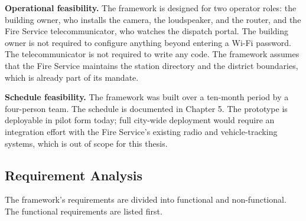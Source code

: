 \textbf{Operational feasibility.} The framework is designed for two operator roles: the building owner, who installs the camera, the loudspeaker, and the router, and the Fire Service telecommunicator, who watches the dispatch portal. The building owner is not required to configure anything beyond entering a Wi-Fi password. The telecommunicator is not required to write any code. The framework assumes that the Fire Service maintains the station directory and the district boundaries, which is already part of its mandate.

\textbf{Schedule feasibility.} The framework was built over a ten-month period by a four-person team. The schedule is documented in Chapter 5. The prototype is deployable in pilot form today; full city-wide deployment would require an integration effort with the Fire Service's existing radio and vehicle-tracking systems, which is out of scope for this thesis.

\subsection{Requirement Analysis}

The framework's requirements are divided into functional and non-functional. The functional requirements are listed first.

